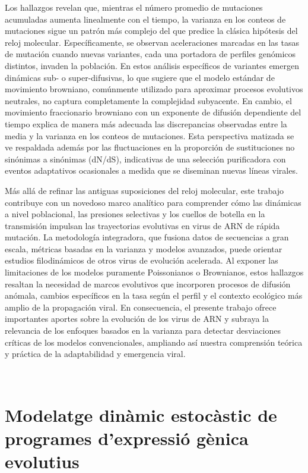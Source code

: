 Los hallazgos revelan que, mientras el número promedio de mutaciones acumuladas aumenta linealmente con el tiempo, la varianza en los conteos de mutaciones sigue un patrón más complejo del que predice la clásica hipótesis del reloj molecular. Específicamente, se observan aceleraciones marcadas en las tasas de mutación cuando nuevas variantes, cada una portadora de perfiles genómicos distintos, invaden la población. En estos análisis específicos de variantes emergen dinámicas sub- o super-difusivas, lo que sugiere que el modelo estándar de movimiento browniano, comúnmente utilizado para aproximar procesos evolutivos neutrales, no captura completamente la complejidad subyacente. En cambio, el movimiento fraccionario browniano con un exponente de difusión dependiente del tiempo explica de manera más adecuada las discrepancias observadas entre la media y la varianza en los conteos de mutaciones. Esta perspectiva matizada se ve respaldada además por las fluctuaciones en la proporción de sustituciones no sinónimas a sinónimas (dN/dS), indicativas de una selección purificadora con eventos adaptativos ocasionales a medida que se diseminan nuevas líneas virales.

Más allá de refinar las antiguas suposiciones del reloj molecular, este trabajo contribuye con un novedoso marco analítico para comprender cómo las dinámicas a nivel poblacional, las presiones selectivas y los cuellos de botella en la transmisión impulsan las trayectorias evolutivas en virus de ARN de rápida mutación. La metodología integradora, que fusiona datos de secuencias a gran escala, métricas basadas en la varianza y modelos avanzados, puede orientar estudios filodinámicos de otros virus de evolución acelerada. Al exponer las limitaciones de los modelos puramente Poissonianos o Brownianos, estos hallazgos resaltan la necesidad de marcos evolutivos que incorporen procesos de difusión anómala, cambios específicos en la tasa según el perfil y el contexto ecológico más amplio de la propagación viral. En consecuencia, el presente trabajo ofrece importantes aportes sobre la evolución de los virus de ARN y subraya la relevancia de los enfoques basados en la varianza para detectar desviaciones críticas de los modelos convencionales, ampliando así nuestra comprensión teórica y práctica de la adaptabilidad y emergencia viral.

\vfill

\pagebreak ~

\chapter*{\Large Modelatge dinàmic estocàstic de programes d'expressió gènica evolutius}

